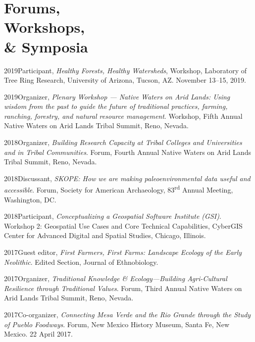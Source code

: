 \section{Forums,\\ Workshops, \\ \& Symposia}

2019\hspace{.2cm}Participant, \emph{Healthy Forests, Healthy Watersheds}, Workshop, Laboratory of Tree Ring Research, University of Arizona, Tucson, AZ. November 13–15, 2019.

2019\hspace{.2cm}Organizer, \emph{Plenary Workshop — Native Waters on Arid Lands: Using wisdom from the past to guide the future of traditional practices, farming, ranching, forestry, and natural resource management}. Workshop, Fifth Annual Native Waters on Arid Lands Tribal Summit, Reno, Nevada.

2018\hspace{.2cm}Organizer, \emph{Building Research Capacity at Tribal Colleges and Universities and in Tribal Communities}. Forum, Fourth Annual Native Waters on Arid Lands Tribal Summit, Reno, Nevada.

2018\hspace{.2cm}Discussant, \emph{SKOPE: How we are making paleoenvironmental data useful and accessible}. Forum, Society for American Archaeology, 83\textsuperscript{rd} Annual Meeting, Washington, DC.

2018\hspace{.2cm}Participant, \emph{Conceptualizing a Geospatial Software Institute (GSI)}. Workshop 2: Geospatial Use Cases and Core Technical Capabilities, CyberGIS Center for Advanced Digital and Spatial Studies, Chicago, Illinois.

2017\hspace{.2cm}Guest editor, \emph{First Farmers, First Farms: Landscape Ecology of the Early Neolithic}. Edited Section, Journal of Ethnobiology.

2017\hspace{.2cm}Organizer, \emph{Traditional Knowledge \& Ecology—Building Agri-Cultural Resilience through Traditional Values}. Forum, Third Annual Native Waters on Arid Lands Tribal Summit, Reno, Nevada.

2017\hspace{.2cm}Co-organizer, \emph{Connecting Mesa Verde and the Rio Grande through the Study of Pueblo Foodways}. Forum, New Mexico History Museum, Santa Fe, New Mexico. 22 April 2017.

